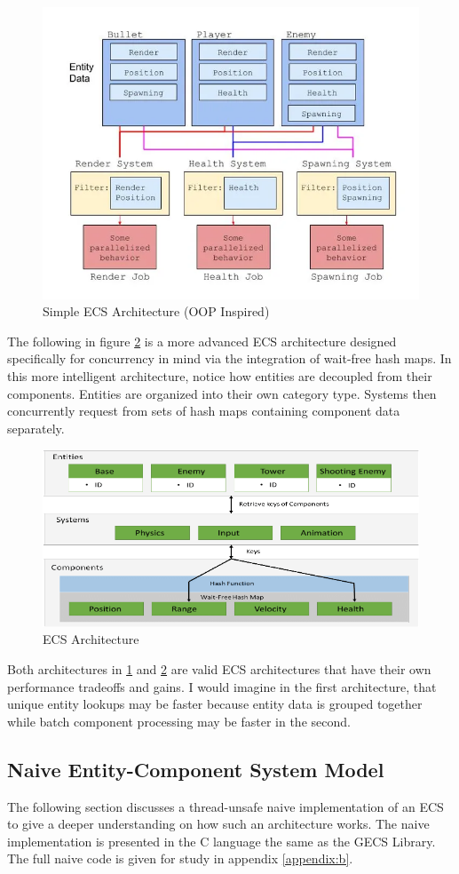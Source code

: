 \begin{figure}[H]
    \centering
    \includegraphics[width=0.7\linewidth]{resources/naive_ecs2.png}
    \caption{Simple ECS Architecture (OOP Inspired)}
    \label{fig:naive1}
\end{figure}


The following in figure \ref{fig:advanced2} is a more advanced ECS architecture designed specifically for concurrency in mind via the integration of wait-free hash maps.\cite{waitfreemapsecs} In this more intelligent architecture, notice how entities are decoupled from their components. Entities are organized into their own category type. Systems then concurrently request from sets of hash maps containing component data separately.

\begin{figure}[htbp]
    \centering
    \includegraphics[width=0.7\linewidth]{resources/ecs2.png}
    \caption{ECS Architecture}
    \label{fig:advanced2}
\end{figure}

Both architectures in \ref{fig:naive1} and \ref{fig:advanced2} are valid ECS architectures that have their own performance tradeoffs and gains. I would imagine in the first architecture, that unique entity lookups may be faster because entity data is grouped together while batch component processing may be faster in the second. 

\subsection{Naive Entity-Component System Model}
\label{sec:ecs_naive}
The following section discusses a thread-unsafe naive implementation of an ECS to give a deeper understanding on how such an architecture works. The naive implementation is presented in the C language the same as the GECS Library. The full naive code is given for study in appendix \ref{appendix:b}.

